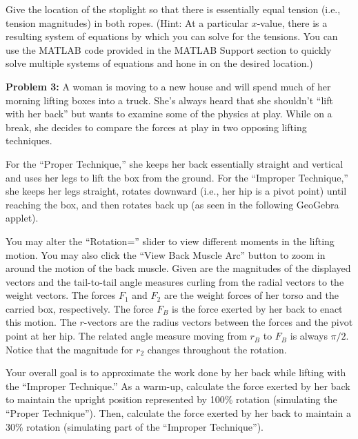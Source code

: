 \documentclass{ximera}
\begin{document}

Give the location of the stoplight so that there is essentially equal tension (i.e., tension magnitudes) in both ropes. (Hint: At a particular $x$-value, there is a resulting system of equations by which you can solve for the tensions. You can use the MATLAB code provided in the MATLAB Support section to quickly solve multiple systems of equations and hone in on the desired location.)

\textbf{Problem 3:} A woman is moving to a new house and will spend much of her morning lifting boxes into a truck. She's always heard that she shouldn't ``lift with her back'' but wants to examine some of the physics at play. While on a break, she decides to compare the forces at play in two opposing lifting techniques.

For the ``Proper Technique,'' she keeps her back essentially straight and vertical and uses her legs to lift the box from the ground. For the ``Improper Technique,'' she keeps her legs straight, rotates downward (i.e., her hip is a pivot point) until reaching the box, and then rotates back up (as seen in the following GeoGebra applet).

You may alter the ``Rotation='' slider to view different moments in the lifting motion. You may also click the ``View Back Muscle Arc'' button to zoom in around the motion of the back muscle. Given are the magnitudes of the displayed vectors and the tail-to-tail angle measures curling from the radial vectors to the weight vectors. The forces $F_1$ and $F_2$ are the weight forces of her torso and the carried box, respectively. The force $F_B$ is the force exerted by her back to enact this motion. The $r$-vectors are the radius vectors between the forces and the pivot point at her hip. The related angle measure moving from $r_B$ to $F_B$ is always $\pi/2$. Notice that the magnitude for $r_2$ changes throughout the rotation.

\begin{center}
\end{center}

Your overall goal is to approximate the work done by her back while lifting with the ``Improper Technique.'' As a warm-up, calculate the force exerted by her back to maintain the upright position represented by 100\% rotation (simulating the ``Proper Technique''). Then, calculate the force exerted by her back to maintain a 30\% rotation (simulating part of the ``Improper Technique'').
\end{document}
